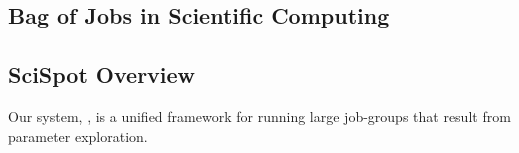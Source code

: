 \subsection{Bag of Jobs in Scientific Computing}


\subsection{SciSpot Overview}
Our system, \sysname, is a unified framework for running large job-groups that result from parameter exploration. 



